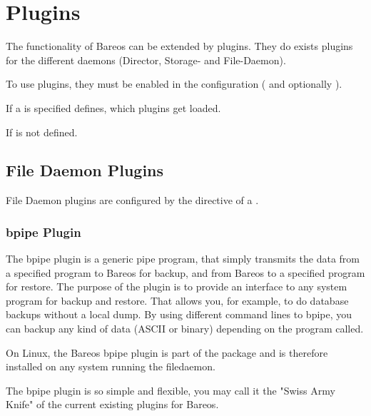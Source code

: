 \chapter{Plugins}
\label{sec:plugins}

The functionality of Bareos can be extended by plugins.
They do exists plugins for the different daemons (Director, Storage- and File-Daemon).

To use plugins, they must be enabled in the configuration ( and optionally ).

If a  is specified
 defines, which plugins get loaded.

If  is not defined.

\section{File Daemon Plugins}
\label{fdPlugins}

File Daemon plugins are configured by the  directive of a .


\subsection{bpipe Plugin}
\label{bpipe}

The bpipe plugin is a generic pipe program, that simply transmits the data from a specified program to Bareos for backup, and
from Bareos to a specified program for restore. The purpose of the plugin is to provide an interface to any system program
for backup and restore. That allows you, for example, to do database backups without a local dump. By using different command 
lines to bpipe, you can backup any kind of data (ASCII or binary) depending on the program called.

On Linux, the Bareos bpipe plugin is part of the  package and is therefore installed on any system running the filedaemon.

The bpipe plugin is so simple and flexible, you may call it the 
"Swiss Army Knife" of the current existing plugins for Bareos.

